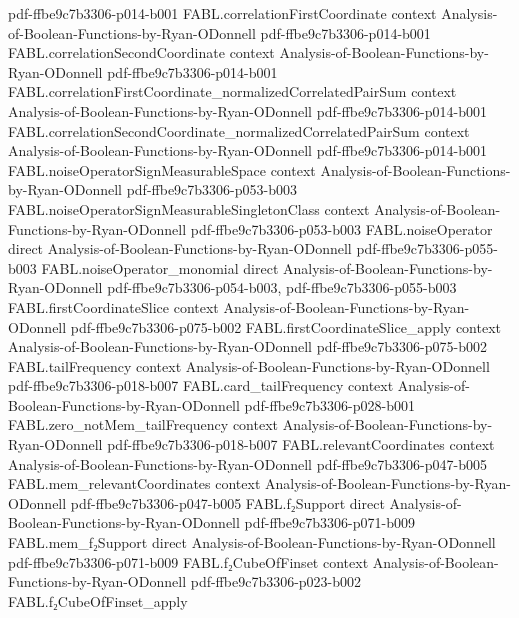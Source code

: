 \begin{theorem}
  {pdf-ffbe9c7b3306-p014-b001}
\proofstep
  {FABL.correlationFirstCoordinate}
  {context}
  {Analysis-of-Boolean-Functions-by-Ryan-ODonnell}
  {pdf-ffbe9c7b3306-p014-b001}
\proofstep
  {FABL.correlationSecondCoordinate}
  {context}
  {Analysis-of-Boolean-Functions-by-Ryan-ODonnell}
  {pdf-ffbe9c7b3306-p014-b001}
\proofstep
  {FABL.correlationFirstCoordinate_normalizedCorrelatedPairSum}
  {context}
  {Analysis-of-Boolean-Functions-by-Ryan-ODonnell}
  {pdf-ffbe9c7b3306-p014-b001}
\proofstep
  {FABL.correlationSecondCoordinate_normalizedCorrelatedPairSum}
  {context}
  {Analysis-of-Boolean-Functions-by-Ryan-ODonnell}
  {pdf-ffbe9c7b3306-p014-b001}
\proofstep
  {FABL.noiseOperatorSignMeasurableSpace}
  {context}
  {Analysis-of-Boolean-Functions-by-Ryan-ODonnell}
  {pdf-ffbe9c7b3306-p053-b003}
\proofstep
  {FABL.noiseOperatorSignMeasurableSingletonClass}
  {context}
  {Analysis-of-Boolean-Functions-by-Ryan-ODonnell}
  {pdf-ffbe9c7b3306-p053-b003}
\proofstep
  {FABL.noiseOperator}
  {direct}
  {Analysis-of-Boolean-Functions-by-Ryan-ODonnell}
  {pdf-ffbe9c7b3306-p055-b003}
\proofstep
  {FABL.noiseOperator_monomial}
  {direct}
  {Analysis-of-Boolean-Functions-by-Ryan-ODonnell}
  {pdf-ffbe9c7b3306-p054-b003,
    pdf-ffbe9c7b3306-p055-b003}
\proofstep
  {FABL.firstCoordinateSlice}
  {context}
  {Analysis-of-Boolean-Functions-by-Ryan-ODonnell}
  {pdf-ffbe9c7b3306-p075-b002}
\proofstep
  {FABL.firstCoordinateSlice_apply}
  {context}
  {Analysis-of-Boolean-Functions-by-Ryan-ODonnell}
  {pdf-ffbe9c7b3306-p075-b002}
\proofstep
  {FABL.tailFrequency}
  {context}
  {Analysis-of-Boolean-Functions-by-Ryan-ODonnell}
  {pdf-ffbe9c7b3306-p018-b007}
\proofstep
  {FABL.card_tailFrequency}
  {context}
  {Analysis-of-Boolean-Functions-by-Ryan-ODonnell}
  {pdf-ffbe9c7b3306-p028-b001}
\proofstep
  {FABL.zero_notMem_tailFrequency}
  {context}
  {Analysis-of-Boolean-Functions-by-Ryan-ODonnell}
  {pdf-ffbe9c7b3306-p018-b007}
\proofstep
  {FABL.relevantCoordinates}
  {context}
  {Analysis-of-Boolean-Functions-by-Ryan-ODonnell}
  {pdf-ffbe9c7b3306-p047-b005}
\proofstep
  {FABL.mem_relevantCoordinates}
  {context}
  {Analysis-of-Boolean-Functions-by-Ryan-ODonnell}
  {pdf-ffbe9c7b3306-p047-b005}
\proofstep
  {FABL.f₂Support}
  {direct}
  {Analysis-of-Boolean-Functions-by-Ryan-ODonnell}
  {pdf-ffbe9c7b3306-p071-b009}
\proofstep
  {FABL.mem_f₂Support}
  {direct}
  {Analysis-of-Boolean-Functions-by-Ryan-ODonnell}
  {pdf-ffbe9c7b3306-p071-b009}
\proofstep
  {FABL.f₂CubeOfFinset}
  {context}
  {Analysis-of-Boolean-Functions-by-Ryan-ODonnell}
  {pdf-ffbe9c7b3306-p023-b002}
\proofstep
  {FABL.f₂CubeOfFinset_apply}

\end{theorem}
